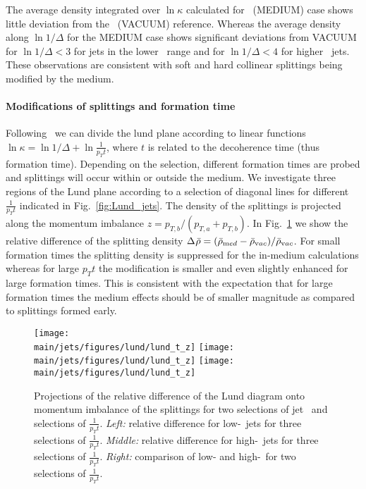 The average density integrated over $\ln \kappa$ calculated for \PbPb\ (MEDIUM) case shows little deviation from the \pp\ (VACUUM) reference.
Whereas the average density along $\ln 1/\Delta$ for the MEDIUM case shows significant deviations from VACUUM for $\ln 1/\Delta < 3$ for jets in the lower \pt\ range and for $\ln 1/\Delta < 4$ for higher \pt\ jets.
These observations are consistent with soft and hard collinear splittings being modified by the medium.

\paragraph{Modifications of splittings and formation time}

Following~\cite{Andrews:2018jcm} we can divide the lund plane according to linear functions $\ln\kappa = \ln1/\Delta + \ln \frac{1}{p_{T} t}$, where $t$ is related to the decoherence time (thus formation time).
Depending on the selection, different formation times are probed and splittings will occur within or outside the medium.
We investigate three regions of the Lund plane according to a selection of diagonal lines for different $\frac{1}{p_{T} t}$ indicated in Fig.~\ref{fig:Lund_jets}.
The density of the splittings is projected along the momentum imbalance $z = p_{T,b}/(p_{T,a} + p_{T,b})$.
In Fig.~\ref{fig:Lund_projections_z} we show the relative difference of the splitting density $\Delta_{\rm}\bar{\rho} = (\bar{\rho}_{\mathrm med} - \bar{\rho}_{\mathrm vac})/\bar{\rho}_{\mathrm vac}$.
For small formation times the splitting density is suppressed for the in-medium calculations whereas for large $p_{T} t$ the modification is smaller and even slightly enhanced for large formation times.
This is consistent with the expectation that for large formation times the medium effects should be of smaller magnitude as compared to splittings formed early.



\begin{figure}[htbp]
	\centering
	\texttt{[image: \\main/jets/figures/lund/lund\_t\_z]}
	\texttt{[image: \\main/jets/figures/lund/lund\_t\_z]}
	\texttt{[image: \\main/jets/figures/lund/lund\_t\_z]}
	\caption{Projections of the relative difference of the Lund diagram onto momentum imbalance of the splittings for two selections of jet \pt\ and selections of $\frac{1}{p_{T} t}$.
	{\it Left:} relative difference for low-\pt\ jets for three selections of $\frac{1}{p_{T} t}$.
	{\it Middle:} relative difference for high-\pt\ jets for three selections of $\frac{1}{p_{T} t}$.
	{\it Right:} comparison of low- and high-\pt\ for two selections of $\frac{1}{p_{T} t}$.
	}
	\label{fig:Lund_projections_z}
\end{figure}

